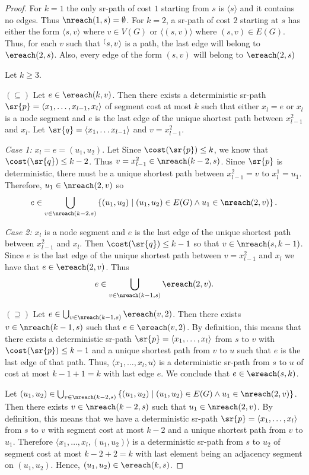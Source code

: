 \begin{proof}
For $k = 1$ the only sr-path of cost $1$ starting from $s$ is $\langle s \rangle$ and it contains no edges. Thus $\nreach(1, s) = \emptyset$.
For $k = 2$, a sr-path of cost $2$ starting at $s$ has either the form $\langle s, v \rangle$ where
$v \in V(G)$ or $\langle (s, v) \rangle$ where $(s, v) \in E(G)$. Thus, for each $v$ such that $\sp(s, v)$ is a path,
the last edge will belong to $\ereach(2, s)$. Also, every edge of the form $(s, v)$ will belong to $\ereach(2, s)$

Let $k \geq 3$.

$(\subseteq)$ Let $e \in \ereach(k, v)$. Then there exists a deterministic sr-path 
$\sr{p} = \langle x_1, \ldots, x_{l - 1}, x_l \rangle$  of segment cost at most $k$ such that
either $x_l = e$ or $x_l$ is a node
segment and $e$ is the last edge of the unique shortest path between $x^2_{l - 1}$
and $x_{l}$. Let $\sr{q} = \langle x_1, \ldots x_{l - 1} \rangle$ and $v = x^2_{l - 1}$.

\emph{Case 1:} $x_l = e = (u_1, u_2)$. Let 
Since $\cost(\sr{p}) \leq k$, we know that
$\cost(\sr{q}) \leq k - 2$. Thus $v = x^2_{l - 1} \in \nreach(k - 2, s)$. 
Since $\sr{p}$ is deterministic, 
there must be a unique shortest path
between $x^2_{l - 1} = v$ to $x^1_l = u_1$. Therefore, $u_1 \in \nreach(2, v)$ so
$$
e \in \bigcup_{v \in \nreach(k - 2, s)}  \left\{ (u_1, u_2) \mid (u_1, u_2) \in E(G) \wedge u_1 \in \nreach(2, v) \right\}.
$$

\emph{Case 2:} $x_l$ is a node segment and $e$ is the last edge of the unique
shortest path between $x^2_{l - 1}$ and $x_l$. Then $\cost(\sr{q}) \leq k - 1$
so that $v \in \nreach(s, k - 1)$. Since $e$ is the last edge of the unique
shortest path between $v = x^2_{l - 1}$ and $x_l$ we have that $e \in \ereach(2, v)$.
Thus
$$
e \in \bigcup_{v \in \nreach(k - 1, s)} \ereach(2, v).
$$

$(\supseteq)$ Let $e \in \bigcup_{v \in \nreach(k - 1, s)} \ereach(v, 2)$. Then
there exists $v \in \nreach(k - 1, s)$ such that $e \in \ereach(v, 2)$. By definition,
this means that there exists a deterministic sr-path $\sr{p} = \langle x_1, \ldots, x_l \rangle$
from $s$ to $v$ with $\cost(\sr{p}) \leq k - 1$ and a unique shortest path from $v$ to $u$
such that $e$ is the last edge of that path. Thus, $\langle x_1, \ldots, x_l, u \rangle$ is a deterministic
sr-path from $s$ to $u$ of cost at most $k - 1 + 1 = k$ with last edge $e$. We conclude that
$e \in \ereach(s, k)$.

Let $(u_1, u_2) \in \bigcup_{v \in \nreach(k - 2, s)}  \left\{ (u_1, u_2) \mid (u_1, u_2) \in E(G) \wedge u_1 \in \nreach(2, v) \right\}$.
Then there exists $v \in \nreach(k - 2, s)$ such that $u_1 \in \nreach(2, v)$. 
By definition, this means that we have a deterministic sr-path $\sr{p} = \langle x_1, \ldots, x_l \rangle$ from $s$ to $v$ with segment cost at most $k - 2$ and
a unique shortest path from $v$ to $u_1$. Therefore $\langle x_1, \ldots, x_l, (u_1, u_2) \rangle$ is a deterministic sr-path
from $s$ to $u_2$ of segment cost at most $k - 2 + 2 = k$ with last element being an adjacency segment
on $(u_1, u_2)$. Hence, $(u_1, u_2) \in \ereach(k, s)$.
\end{proof}


